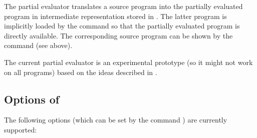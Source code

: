 \begin{description}
The partial evaluator
translates a source program  into the
partially evaluated program in intermediate representation
stored in . The latter program is implicitly loaded
by the  command so that the partially evaluated program
is directly available. The corresponding source program
can be shown by the  command (see above).

The current partial evaluator is an experimental prototype
(so it might not work on all programs) based on the ideas
described in \cite{AlbertAlpuenteHanusVidal99LPAR,AlbertHanusVidal00LPAR,%
AlbertHanusVidal01FLOPS,AlbertHanusVidal02JFLP}.

\end{description}


\subsection{Options of \CYS}
\label{sec:options}

The following options (which can be set by the command )
are currently supported:

